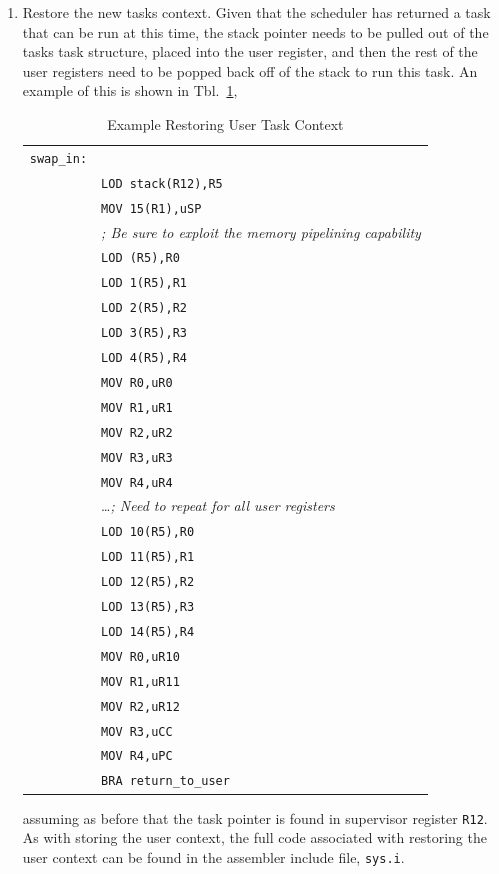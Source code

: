 \documentclass{gqtekspec}
\begin{document}
\begin{enumerate}
\item Restore the new tasks context.  Given that the scheduler has returned a
	task that can be run at this time, the stack pointer needs to be 
	pulled out of the tasks task structure, placed into the user
	register, and then the rest of the user registers need to be popped
	back off of the stack to run this task.  An example of this is
	shown in Tbl.~\ref{tbl:context-in},
\begin{table}\begin{center}
\begin{tabular}{ll}
{\tt swap\_in:} \\
&	{\tt LOD stack(R12),R5} \\
&	{\tt MOV 15(R1),uSP} \\
	& {\em ; Be sure to exploit the memory pipelining capability} \\
&	{\tt LOD (R5),R0} \\
&	{\tt LOD 1(R5),R1} \\
&	{\tt LOD 2(R5),R2} \\
&	{\tt LOD 3(R5),R3} \\
&	{\tt LOD 4(R5),R4} \\
&	{\tt MOV R0,uR0} \\
&	{\tt MOV R1,uR1} \\
&	{\tt MOV R2,uR2} \\
&	{\tt MOV R3,uR3} \\
&	{\tt MOV R4,uR4} \\
	& \ldots {\em ; Need to repeat for all user registers} \\
&	{\tt LOD 10(R5),R0} \\
&	{\tt LOD 11(R5),R1} \\
&	{\tt LOD 12(R5),R2} \\
&	{\tt LOD 13(R5),R3} \\
&	{\tt LOD 14(R5),R4} \\
&	{\tt MOV R0,uR10} \\
&	{\tt MOV R1,uR11} \\
&	{\tt MOV R2,uR12} \\
&	{\tt MOV R3,uCC} \\
&	{\tt MOV R4,uPC} \\

&	{\tt BRA return\_to\_user} \\
\end{tabular}
\caption{Example Restoring User Task Context}\label{tbl:context-in}
\end{center}\end{table}
	assuming as before that the task
	pointer is found in supervisor register {\tt R12}.
	As with storing the user context, the full code associated with
	restoring the user context can be found in the assembler include
	file, {\tt sys.i}.


\end{enumerate}
\end{document}
